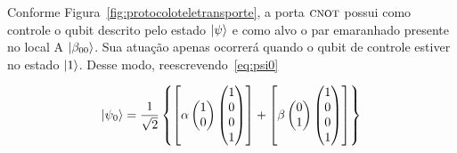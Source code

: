 Conforme Figura~\ref{fig:protocoloteletransporte}, a porta \(\operatorname{\textsc{cnot}}\) possui como controle o qubit descrito pelo estado $\ket{\psi}$ e como alvo o par emaranhado presente no local A $\ket{\beta_{00}}$. Sua atuação apenas ocorrerá quando o qubit de controle estiver no estado $\ket{1}$. Desse modo, reescrevendo~\eqref{eq:psi0}

\begin{equation}\label{eq:psi0cnot}
\ket{\psi_0} = \frac{1}{\sqrt{2}}\left\{\left[\alpha \begin{pmatrix}
1 \\
0 
\end{pmatrix}  \begin{pmatrix}
1 \\
0 \\
0 \\
1
\end{pmatrix}\right] + \left[\beta \begin{pmatrix}
0 \\
1
\end{pmatrix}  \begin{pmatrix}
1 \\
0 \\
0 \\
1
\end{pmatrix}\right] \right\}
\end{equation}

